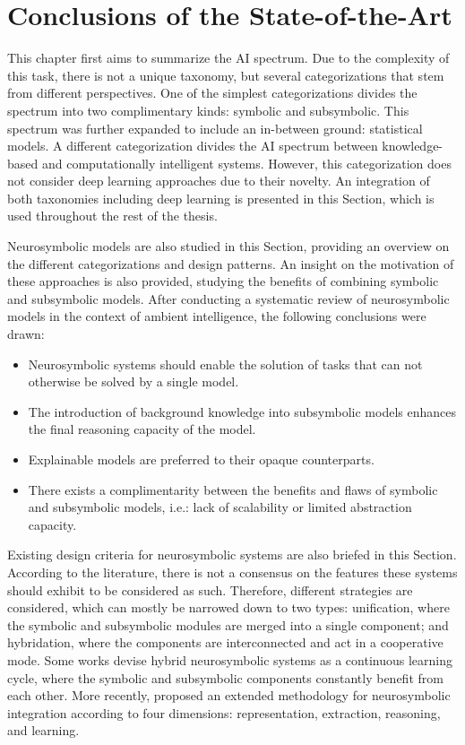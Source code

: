 \section{Conclusions of the State-of-the-Art}
This chapter first aims to summarize the AI spectrum. Due to the complexity of this task, there is not a unique taxonomy, but several categorizations that stem from different perspectives. One of the simplest categorizations divides the spectrum into two complimentary kinds: symbolic and subsymbolic. This spectrum was further expanded to include an in-between ground: statistical models. A different categorization divides the AI spectrum between knowledge-based and computationally intelligent systems. However, this categorization does not consider deep learning approaches due to their novelty. An integration of both taxonomies including deep learning is presented in this Section, which is used throughout the rest of the thesis.

Neurosymbolic models are also studied in this Section, providing an overview on the different categorizations and design patterns. An insight on the motivation of these approaches is also provided, studying the benefits of combining symbolic and subsymbolic models. After conducting a systematic review of neurosymbolic models in the context of ambient intelligence, the following conclusions were drawn:
\begin{itemize}
    \item Neurosymbolic systems should enable the solution of tasks that can not otherwise be solved by a single model.
    \item The introduction of background knowledge into subsymbolic models enhances the final reasoning capacity of the model.
    \item Explainable models are preferred to their opaque counterparts.
    \item There exists a complimentarity between the benefits and flaws of symbolic and subsymbolic models, i.e.: lack of scalability or limited abstraction capacity.
\end{itemize}

Existing design criteria for neurosymbolic systems are also briefed in this Section. According to the literature, there is not a consensus on the features these systems should exhibit to be considered as such. Therefore, different strategies are considered, which can mostly be narrowed down to two types: unification, where the symbolic and subsymbolic modules are merged into a single component; and hybridation, where the components are interconnected and act in a cooperative mode. Some works devise hybrid neurosymbolic systems as a continuous learning cycle, where the symbolic and subsymbolic components constantly benefit from each other. More recently, \cite{garcez_neural-symbolic_2019} proposed an extended methodology for neurosymbolic integration according to four dimensions: representation, extraction, reasoning, and learning.

